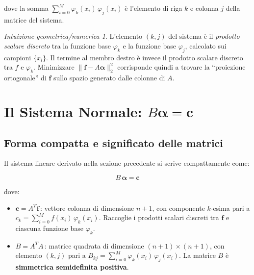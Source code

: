 \documentclass[a4paper,12pt]{article}
\theoremstyle{definition}
\theoremstyle{remark}
\newtheorem*{intuizione}{Intuizione geometrica/numerica}
\begin{document}
\noindent dove la somma $\sum_{i=0}^{M} \varphi_k(x_i)\,\varphi_j(x_i)$
è l'elemento di riga $k$ e colonna $j$ della matrice del sistema.

\begin{intuizione}
L'elemento $(k,j)$ del sistema è il \emph{prodotto scalare discreto}
tra la funzione base $\varphi_k$ e la funzione base $\varphi_j$,
calcolato sui campioni $\{x_i\}$. Il termine al membro destro è invece
il prodotto scalare discreto tra $f$ e $\varphi_k$.
Minimizzare $\|\mathbf{f} - A\boldsymbol{\alpha}\|_2^2$ corrisponde
quindi a trovare la ``proiezione ortogonale'' di $\mathbf{f}$ sullo
spazio generato dalle colonne di $A$.
\end{intuizione}

\section{Il Sistema Normale: $B\boldsymbol{\alpha} = \mathbf{c}$}

\subsection{Forma compatta e significato delle matrici}

Il sistema lineare derivato nella sezione precedente si scrive
compattamente come:

\begin{equation}
  \boxed{B\,\boldsymbol{\alpha} = \mathbf{c}}
  \label{eq:sistema-normale}
\end{equation}

\noindent dove:
\begin{itemize}
  \item $\mathbf{c} = A^T \mathbf{f}$\,: vettore colonna di dimensione
        $n+1$, con componente $k$-esima pari a
        $c_k = \sum_{i=0}^{M} f(x_i)\,\varphi_k(x_i)$.
        Raccoglie i prodotti scalari discreti tra $\mathbf{f}$ e ciascuna
        funzione base $\varphi_k$.

  \item $B = A^T A$\,: matrice quadrata di dimensione $(n+1)\times(n+1)$,
        con elemento $(k,j)$ pari a
        $B_{kj} = \sum_{i=0}^{M}\varphi_k(x_i)\,\varphi_j(x_i)$.
        La matrice $B$ è \textbf{simmetrica semidefinita positiva}.
\end{itemize}
\end{document}
